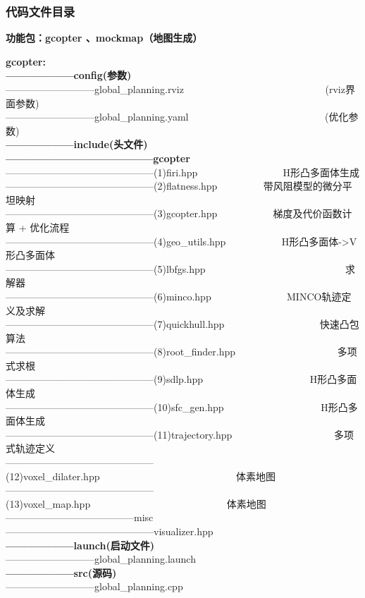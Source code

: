 \subsubsection{代码文件目录} 
\begin{tcolorbox}[green]
    \textbf{功能包：gcopter 、mockmap（地图生成）}
\end{tcolorbox}
\begin{tcolorbox}[red]
    \textbf{gcopter:}\\
    \textbf{——————config(参数)}\\
    —————————global\_planning.rviz  ~~~~~~~~~~~~~~~~~~~~~~~~~~~~(rviz界面参数)\\
    —————————global\_planning.yaml   ~~~~~~~~~~~~~~~~~~~~~~~~~~~(优化参数)\\
    \textbf{——————include(头文件)}\\
    \textbf{—————————————gcopter}\\
    ———————————————(1)firi.hpp         ~~~~~~~~~~~~~~~~   H形凸多面体生成\\    
    ———————————————(2)flatness.hpp      ~~~~~~~~ 带风阻模型的微分平坦映射\\
    ———————————————(3)gcopter.hpp       ~~~~~~~~~~     梯度及代价函数计算 + 优化流程\\
    ———————————————(4)geo\_utils.hpp    ~~~~~~~~~~     H形凸多面体->V形凸多面体\\
    ———————————————(5)lbfgs.hpp         ~~~~~~~~~~~~~~~~~~~~~~~~~~~  求解器\\
    ———————————————(6)minco.hpp      ~~~~~~~~~~~~~~    MINCO轨迹定义及求解   \\
    ———————————————(7)quickhull.hpp     ~~~~~~~~~~~~~~~~~~ 快速凸包算法\\
    ———————————————(8)root\_finder.hpp      ~~~~~~~~~~~~~~~~~~~~多项式求根\\
    ———————————————(9)sdlp.hpp~~~~~~~~~~~~~~~~~~~~~  H形凸多面体生成\\
    ———————————————(10)sfc\_gen.hpp~~~~~~~~~~~~~~~~~~~  H形凸多面体生成\\
    ———————————————(11)trajectory.hpp~~~~~~~~~~~~~~~~~~~~  多项式轨迹定义\\
    ———————————————(12)voxel\_dilater.hpp~~~~~~~~~~~~~~~~~~~~~~~~~~~  体素地图\\
    ———————————————(13)voxel\_map.hpp~~~~~~~~~~~~~~~~~~~~~~~~~~~  体素地图\\
    —————————————misc\\
    ———————————————visualizer.hpp\\
    \textbf{——————launch(启动文件)}\\
    —————————global\_planning.launch\\
    \textbf{——————src(源码)}\\
    —————————global\_planning.cpp
\end{tcolorbox}

